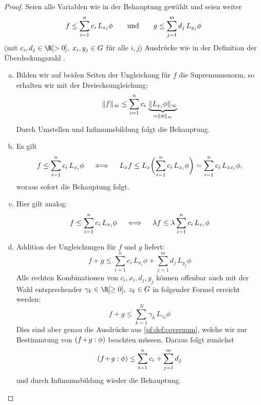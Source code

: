 \begin{proof}
    Seien alle Variablen wie in der Behauptung gewählt und seien weiter
    \[  f \leq \sum_{i=1}^n c_i \, L_{x_i}\phi
        \qquad\text{und}\qquad
        g \leq \sum_{j=1}^m d_j \, L_{y_j}\phi
    \]
    (mit $c_i,d_j\in\R[>0],\; x_i,y_j\in G$ für alle $i,j$) 
    Ausdrücke wie in der Definition der Überdeckungszahl .
    \begin{enumerate}[(a)]
        \item 
            Bilden wir auf beiden Seiten der Ungleichung für $f$ die
            Supremumsnorm, so erhalten wir mit der Dreiecksungleichung:
            \[ \lVert f\rVert_\infty \leq \sum_{i=1}^n c_i \,
                \underbrace{\lVert L_{x_i}\phi\rVert_\infty}_{=\lVert\phi\rVert_\infty}
            \]
            Durch Umstellen und Infimumsbildung folgt die Behauptung.
            
        \item
            Es gilt
            \[  f \leq \sum_{i=1}^n c_i \, L_{x_i}\phi 
                \quad\iff\quad
                L_xf \leq L_x \biggl( \sum_{i=1}^n c_i \, L_{x_i}\phi \biggr)
                        = \sum_{i=1}^n c_i \, L_{xx_i}\phi
            , \]
            woraus sofort die Behauptung folgt.
            
        \item
            Hier gilt analog:
            \[  f \leq \sum_{i=1}^n c_i \, L_{x_i}\phi 
                \quad\iff\quad
                \lambda f \leq \lambda \sum_{i=1}^n c_i \, L_{x_i}\phi
            \]
            
        \item
            Addition der Ungleichungen für $f$ und $g$ liefert:
            \[ f+g \leq 
                \sum_{i=1}^n c_i\,L_{x_i}\phi + \sum_{j=1}^m d_j\,L_{y_j}\phi
            \]
            Alle rechten Kombinationen von $c_i,x_i,d_j,y_j$ können offenbar
            auch mit der Wahl entsprechender $\gamma_k\in\R[\geq0],\; z_k\in G$
            in folgender Formel erreicht werden:
            \[ f+g \leq \sum_{k=1}^N \gamma_k \, L_{z_k}\phi \]
            Dies sind aber genau die Ausdrücke aus \cref{pf:def:covernum},
            welche wir zur Bestimmtung von $(f\mkern1mu{+}\mkern2mu g : \phi)$
            beachten müssen. Daraus folgt zunächst
            \[ (f\mkern1mu{+}\mkern2mu g : \phi) \leq 
                    \sum_{i=1}^n c_i + \sum_{j=1}^m d_j
            \]
            und durch Infimumsbildung wieder die Behauptung.
            

\end{enumerate}
\end{proof}
